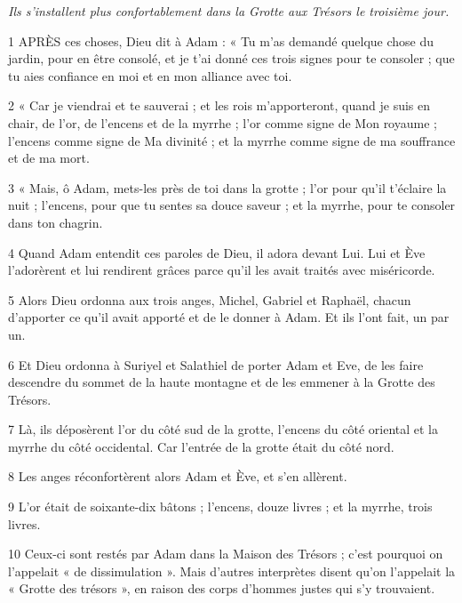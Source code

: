 \par \textit{Ils s'installent plus confortablement dans la Grotte aux Trésors le troisième jour.}

\par 1 APRÈS ces choses, Dieu dit à Adam : « Tu m'as demandé quelque chose du jardin, pour en être consolé, et je t'ai donné ces trois signes pour te consoler ; que tu aies confiance en moi et en mon alliance avec toi.

\par 2 « Car je viendrai et te sauverai ; et les rois m'apporteront, quand je suis en chair, de l'or, de l'encens et de la myrrhe ; l'or comme signe de Mon royaume ; l'encens comme signe de Ma divinité ; et la myrrhe comme signe de ma souffrance et de ma mort.

\par 3 « Mais, ô Adam, mets-les près de toi dans la grotte ; l'or pour qu'il t'éclaire la nuit ; l'encens, pour que tu sentes sa douce saveur ; et la myrrhe, pour te consoler dans ton chagrin.

\par 4 Quand Adam entendit ces paroles de Dieu, il adora devant Lui. Lui et Ève l'adorèrent et lui rendirent grâces parce qu'il les avait traités avec miséricorde.

\par 5 Alors Dieu ordonna aux trois anges, Michel, Gabriel et Raphaël, chacun d'apporter ce qu'il avait apporté et de le donner à Adam. Et ils l’ont fait, un par un.

\par 6 Et Dieu ordonna à Suriyel et Salathiel de porter Adam et Eve, de les faire descendre du sommet de la haute montagne et de les emmener à la Grotte des Trésors.

\par 7 Là, ils déposèrent l'or du côté sud de la grotte, l'encens du côté oriental et la myrrhe du côté occidental. Car l’entrée de la grotte était du côté nord.

\par 8 Les anges réconfortèrent alors Adam et Ève, et s'en allèrent.

\par 9 L'or était de soixante-dix bâtons ; l'encens, douze livres ; et la myrrhe, trois livres.

\par 10 Ceux-ci sont restés par Adam dans la Maison des Trésors ; c'est pourquoi on l'appelait « de dissimulation ». Mais d’autres interprètes disent qu’on l’appelait la « Grotte des trésors », en raison des corps d’hommes justes qui s’y trouvaient.

